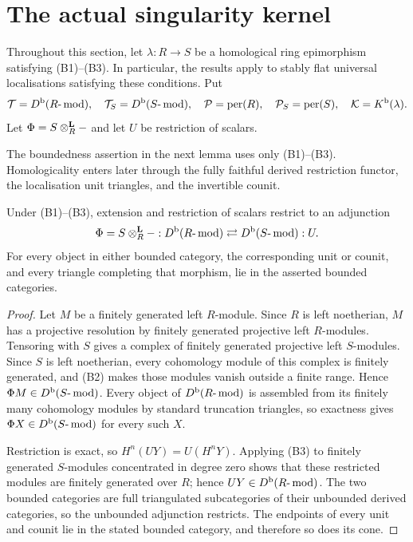 
\section{The actual singularity kernel}\label{sec:actual-kernel}

Throughout this section, let \(\lambda:R\to S\) be a homological ring epimorphism satisfying \textup{(B1)--(B3)}.  In particular, the results apply to stably flat universal localisations satisfying these conditions.  Put
\[
 \mathcal T=D^{\mathrm b}(R\text{-}\operatorname{mod}),\quad
 \mathcal T_S=D^{\mathrm b}(S\text{-}\operatorname{mod}),\quad
 \mathcal P=\operatorname{per}(R),\quad
 \mathcal P_S=\operatorname{per}(S),\quad
 \mathcal K=K^{\mathrm b}(\lambda).
\]
Let \(\Phi=S\otimes^{\mathbf L}_R-\) and let \(U\) be restriction of scalars.

The boundedness assertion in the next lemma uses only \textup{(B1)--(B3)}.  Homologicality enters later through the fully faithful derived restriction functor, the localisation unit triangles, and the invertible counit.

\begin{lemma}\label{lem:bounded-adjunction}
Under \textup{(B1)--(B3)}, extension and restriction of scalars restrict to an adjunction
\[
 \Phi=S\otimes^{\mathbf L}_R-:D^{\mathrm b}(R\text{-}\operatorname{mod})
 \rightleftarrows
 D^{\mathrm b}(S\text{-}\operatorname{mod}):U.
\]
For every object in either bounded category, the corresponding unit or counit, and every triangle completing that morphism, lie in the asserted bounded categories.
\end{lemma}

\begin{proof}
Let \(M\) be a finitely generated left \(R\)-module.  Since \(R\) is left noetherian, \(M\) has a projective resolution by finitely generated projective left \(R\)-modules.  Tensoring with \(S\) gives a complex of finitely generated projective left \(S\)-modules.  Since \(S\) is left noetherian, every cohomology module of this complex is finitely generated, and \textup{(B2)} makes those modules vanish outside a finite range.  Hence \(\Phi M\in D^{\mathrm b}(S\text{-}\operatorname{mod})\).  Every object of \(D^{\mathrm b}(R\text{-}\operatorname{mod})\) is assembled from its finitely many cohomology modules by standard truncation triangles, so exactness gives \(\Phi X\in D^{\mathrm b}(S\text{-}\operatorname{mod})\) for every such \(X\).

Restriction is exact, so \(H^n(UY)=U(H^nY)\).  Applying \textup{(B3)} to finitely generated \(S\)-modules concentrated in degree zero shows that these restricted modules are finitely generated over \(R\); hence \(UY\in D^{\mathrm b}(R\text{-}\operatorname{mod})\).  The two bounded categories are full triangulated subcategories of their unbounded derived categories, so the unbounded adjunction restricts.  The endpoints of every unit and counit lie in the stated bounded category, and therefore so does its cone.
\end{proof}

